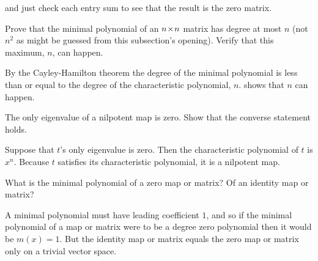\begin{exercises}
\begin{answer}
      and just check each entry sum to see that the result is the zero matrix.
    \end{answer}
  \recommended \item
    Prove that the minimal polynomial of an \( n \! \times \! n \) matrix has
    degree at most \( n \) (not \( n^2 \) as might be guessed from this
    subsection's opening).
    Verify that this maximum, \( n \), can happen.
    \begin{answer}
      By the Cayley-Hamilton theorem the degree of the minimal polynomial is
      less than or equal to the degree of the characteristic polynomial,
      \( n \).
       shows that \( n \) can happen.
    \end{answer}
   \recommended \item 
     The only eigenvalue of a nilpotent map is zero.
     Show that the converse statement holds.
     \begin{answer}
       Suppose that \( t \)'s only eigenvalue is zero.
       Then the characteristic polynomial of \( t \) is \( x^n \).
       Because \( t \) satisfies its characteristic polynomial, it is
       a nilpotent map. 
     \end{answer}
   \item 
       What is the minimal polynomial of a zero map or matrix?
       Of an identity map or matrix?
       \begin{answer}
         A minimal polynomial must have leading coefficient $1$, 
         and so if the minimal polynomial of a map or matrix were to 
         be a degree zero polynomial then it would be $m(x)=1$.
         But the identity map or matrix equals the zero map or matrix
         only on a trivial vector space.


\end{answer}
\end{exercises}
